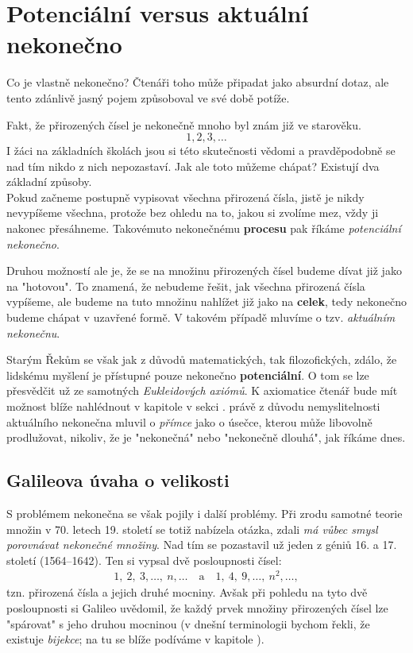 \section{Potenciální versus aktuální nekonečno}\label{sec:pot_vs_akt_nekonecno}

Co je vlastně nekonečno? Čtenáři toho může připadat jako absurdní dotaz, ale tento zdánlivě jasný pojem způsoboval ve své době potíže.\par
Fakt, že přirozených čísel je nekonečně mnoho byl znám již ve starověku.
\begin{equation*}
1,2,3,\dots
\end{equation*}
I žáci na základních školách jsou si této skutečnosti vědomi a pravděpodobně se nad tím nikdo z nich nepozastaví. Jak ale toto můžeme chápat? Existují dva základní způsoby.\\
Pokud začneme postupně vypisovat všechna přirozená čísla, jistě je nikdy nevypíšeme všechna, protože bez ohledu na to, jakou si zvolíme mez, vždy ji nakonec přesáhneme. Takovémuto nekonečnému \textbf{procesu} pak říkáme \emph{potenciální nekonečno}.\par
Druhou možností ale je, že se na množinu přirozených čísel budeme dívat již jako na "hotovou". To znamená, že nebudeme řešit, jak všechna přirozená čísla vypíšeme, ale budeme na tuto množinu nahlížet již jako na \textbf{celek}, tedy nekonečno budeme chápat v uzavřené formě. V takovém případě mluvíme o tzv. \emph{aktuálním nekonečnu}.
\medskip

Starým Řekům se však jak z důvodů matematických, tak filozofických, zdálo, že lidskému myšlení je přístupné pouze nekonečno \textbf{potenciální}. O tom se lze přesvědčit už ze samotných \emph{Eukleidových axiómů}. K axiomatice čtenář bude mít možnost blíže nahlédnout v kapitole  v sekci .  právě z důvodu nemyslitelnosti aktuálního nekonečna mluvil o \emph{přímce} jako o úsečce, kterou může libovolně prodlužovat, nikoliv, že je "nekonečná" nebo "nekonečně dlouhá", jak říkáme dnes.

\subsection{Galileova úvaha o velikosti}
\label{subsec:galileo}

S problémem nekonečna se však pojily i další problémy. Při zrodu samotné teorie množin v 70. letech 19. století se totiž nabízela otázka, zdali \emph{má vůbec smysl porovnávat nekonečné množiny}. Nad tím se pozastavil už jeden z géniů 16. a 17. století  (1564--1642). Ten si vypsal dvě posloupnosti čísel:
\begin{align*}
1,\ 2,\ 3,\dots,\ n,\dots \quad \text{a} \quad 1,\ 4,\ 9,\dots,\ n^2,\dots ,
\end{align*}
tzn. přirozená čísla a jejich druhé mocniny. Avšak při pohledu na tyto dvě posloupnosti si Galileo uvědomil, že každý prvek množiny přirozených čísel lze "spárovat" s jeho druhou mocninou (v dnešní terminologii bychom řekli, že existuje \emph{bijekce}; na tu se blíže podíváme v kapitole ).

